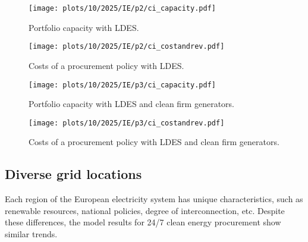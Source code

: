 \begin{figure*}
    \centering
    \begin{subfigure}{0.5\textwidth}
        \centering
        \caption{Portfolio capacity with LDES.}
        \texttt{[image: plots/10/2025/IE/p2/ci\_capacity.pdf]}
        \label{fig:10-2025-IE-p2-ci_capacity}
    \end{subfigure}%
    \begin{subfigure}{0.5\textwidth}
        \centering
        \caption{Costs of a procurement policy with LDES.}
        \texttt{[image: plots/10/2025/IE/p2/ci\_costandrev.pdf]}
        \label{fig:10-2025-IE-p2-ci_costandrev}
    \end{subfigure}
    \begin{subfigure}{0.5\textwidth}
        \centering
        \caption{Portfolio capacity with LDES and clean firm generators.}
        \texttt{[image: plots/10/2025/IE/p3/ci\_capacity.pdf]}
        \label{fig:10-2025-IE-p3-ci_capacity}
    \end{subfigure}%
    \begin{subfigure}{0.5\textwidth}
        \centering
        \caption{Costs of a procurement policy with LDES and clean firm generators.}
        \texttt{[image: plots/10/2025/IE/p3/ci\_costandrev.pdf]}
        \label{fig:10-2025-IE-p3-ci_costandrev}
    \end{subfigure}
    \caption{Procurement of clean resources and energy storage if \gls{ci} consumers located in Ireland have an access to a wider palette of technologies.
    The top row shows the power capacity portfolio (\cref{fig:10-2025-IE-p2-ci_capacity}) and the breakdown of costs (\cref{fig:10-2025-IE-p2-ci_costandrev}) 
    if \gls{ldes} is available on the market.
    The bottom row shows the power capacity portfolio (\cref{fig:10-2025-IE-p3-ci_capacity}) and the breakdown of costs (\cref{fig:10-2025-IE-p3-ci_costandrev}) 
    for a case when both \gls{ldes} and clean firm dispatchable generators are available.}
    \label{fig:10-2025-IE-p23-ci_procurement}
\end{figure*}


\subsection{Diverse grid locations}
\label{subsec:location}

\vspace{10pt}
\begin{res}
    Each region of the European electricity system has unique characteristics, such as renewable resources, national policies, degree of interconnection, etc.
    Despite these differences, the model results for 24/7 clean energy procurement show similar trends. 
\end{res}

